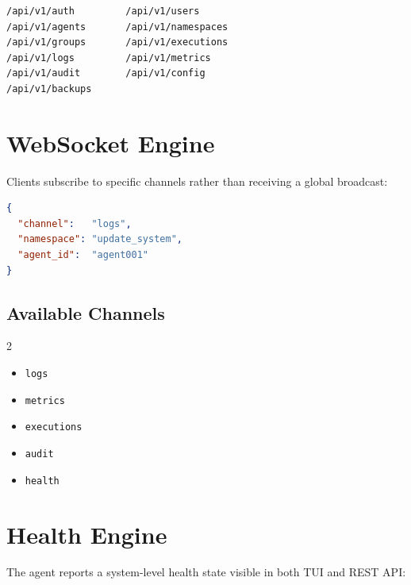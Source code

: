 \documentclass[12pt,a4paper]{article}
\begin{document}
\begin{lstlisting}[language=bash]
/api/v1/auth         /api/v1/users
/api/v1/agents       /api/v1/namespaces
/api/v1/groups       /api/v1/executions
/api/v1/logs         /api/v1/metrics
/api/v1/audit        /api/v1/config
/api/v1/backups
\end{lstlisting}

\section{WebSocket Engine}

Clients subscribe to specific channels rather than receiving a global broadcast:

\begin{lstlisting}[language=json, caption={WebSocket subscription example}]
{
  "channel":   "logs",
  "namespace": "update_system",
  "agent_id":  "agent001"
}
\end{lstlisting}

\subsection{Available Channels}

\begin{multicols}{2}
\begin{itemize}[noitemsep,leftmargin=*]
    \item \texttt{logs}
    \item \texttt{metrics}
    \item \texttt{executions}
    \item \texttt{audit}
    \item \texttt{health}
\end{itemize}
\end{multicols}

\section{Health Engine}

The agent reports a system-level health state visible in both TUI and REST API:
\end{document}
